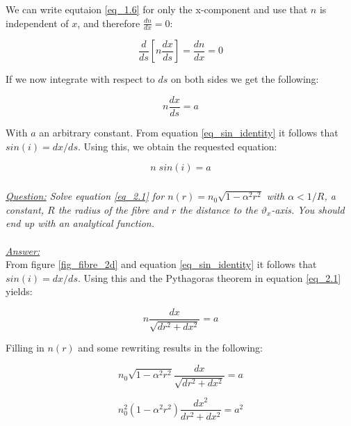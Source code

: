 \documentclass{article}
\begin{document}
We can write equtaion \ref{eq_1.6} for only the x-component and use that $n$ is independent of $x$, and therefore $\frac{d n}{dx} = 0$:

\begin{equation}
	\frac{d}{ds} \left[ n \frac{d x}{ds} \right] = \frac{d n}{dx} = 0
\end{equation}

If we now integrate with respect to $ds$ on both sides we get the following:

\begin{equation}
	n \frac{d x}{ds} = a
\end{equation}

With $a$ an arbitrary constant. From  equation \ref{eq_sin_identity} it follows that $sin(i) = dx/ds$. Using this, we obtain the requested equation:

\begin{equation}
	n \; sin(i) = a
\end{equation}

\subsubsection{}

\textit{\underline{Question:} Solve equation \ref{eq_2.1} for $n(r) = n_0 \sqrt{1 - \alpha ^2 r^2}$ with $\alpha < 1/R$, a constant, $R$ the radius of the fibre and $r$ the distance to the $\vartheta _x$-axis. You should end up with an analytical function.}\\
\\
\textit{\underline{Answer:}} \\
From figure \ref{fig_fibre_2d} and equation \ref{eq_sin_identity} it follows that $ sin(i) = dx/ds$. Using this and the Pythagoras theorem in equation \ref{eq_2.1} yields:

\begin{equation*}
	n  \frac{dx}{\sqrt{dr^2 + dx^2}} = a
\end{equation*}

Filling in $n(r)$ and some rewriting results in the following:

\begin{equation*}
	n_0 \sqrt{1 - \alpha ^2 r^2}  \frac{dx}{\sqrt{dr^2 + dx^2}} = a
\end{equation*}

\begin{equation*}
	n_0^2 (1 - \alpha ^2 r^2)  \frac{dx^2}{dr^2 + dx^2} = a^2
\end{equation*}
\end{document}
